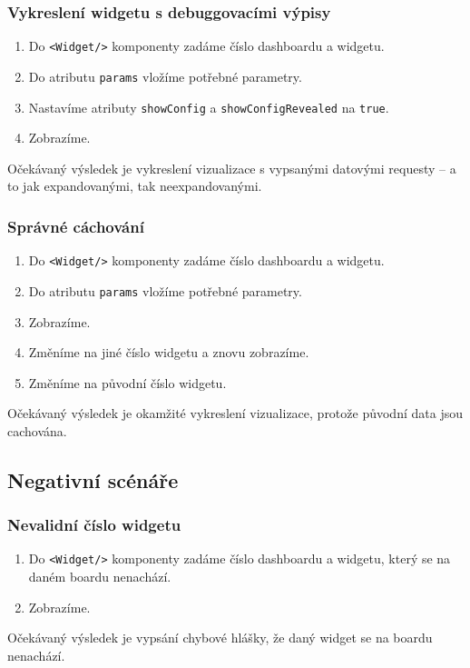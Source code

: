 \documentclass[czech, bc, kiv, he, iso690numb]{fasthesis}
\begin{document}
\subsubsection{Vykreslení widgetu s debuggovacími výpisy}
\begin{enumerate}
	\item Do \texttt{<Widget/>} komponenty zadáme číslo dashboardu a widgetu.
	\item Do atributu \texttt{params} vložíme potřebné parametry.
	\item Nastavíme atributy \texttt{showConfig} a \texttt{showConfigRevealed} na \texttt{true}.
	\item Zobrazíme.
\end{enumerate}
Očekávaný výsledek je vykreslení vizualizace s vypsanými datovými requesty – a to jak expandovanými, tak neexpandovanými.

\subsubsection{Správné cáchování}
\begin{enumerate}
	\item Do \texttt{<Widget/>} komponenty zadáme číslo dashboardu a widgetu.
	\item Do atributu \texttt{params} vložíme potřebné parametry.
	\item Zobrazíme.
	\item Změníme na jiné číslo widgetu a znovu zobrazíme.
	\item Změníme na původní číslo widgetu.
\end{enumerate}
Očekávaný výsledek je okamžité vykreslení vizualizace, protože původní data jsou cachována.

\subsection{Negativní scénáře}
\subsubsection{Nevalidní číslo widgetu}
\begin{enumerate}
	\item Do \texttt{<Widget/>} komponenty zadáme číslo dashboardu a widgetu, který se na daném boardu nenachází.
	\item Zobrazíme.
\end{enumerate}
Očekávaný výsledek je vypsání chybové hlášky, že daný widget se na boardu nenachází.
\end{document}
